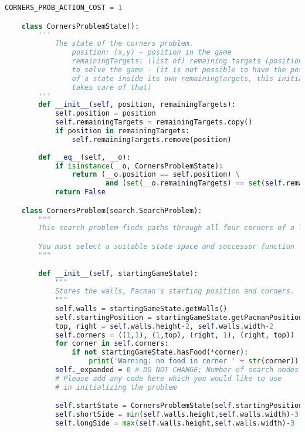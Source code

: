 \documentclass{article}
\begin{document}
\begin{lstlisting}[language=python,captionpos=t,caption={The state and problem definition of the corners problem (\emph{searchAgents.py})}]
    CORNERS_PROB_ACTION_COST = 1

    class CornersProblemState():
        '''
            The state of the corners problem.
                position: (x,y) - position in the game
                remainingTargets: (list of) remaining targets (positions) 
                to solve the game - (it is not possible to have the position 
                of a state inside its own remainingTargets, this initialization
                takes care of that)
        '''
        def __init__(self, position, remainingTargets):
            self.position = position
            self.remainingTargets = remainingTargets.copy()
            if position in remainingTargets:
                self.remainingTargets.remove(position)
        
        def __eq__(self, __o):
            if isinstance(__o, CornersProblemState):
                return (__o.position == self.position) \
                        and (set(__o.remainingTargets) == set(self.remainingTargets)) 
            return False

    class CornersProblem(search.SearchProblem):
        """
        This search problem finds paths through all four corners of a layout.

        You must select a suitable state space and successor function
        """

        def __init__(self, startingGameState):
            """
            Stores the walls, Pacman's starting position and corners.
            """
            self.walls = startingGameState.getWalls()
            self.startingPosition = startingGameState.getPacmanPosition()
            top, right = self.walls.height-2, self.walls.width-2
            self.corners = ((1,1), (1,top), (right, 1), (right, top))
            for corner in self.corners:
                if not startingGameState.hasFood(*corner):
                    print('Warning: no food in corner ' + str(corner))
            self._expanded = 0 # DO NOT CHANGE; Number of search nodes expanded
            # Please add any code here which you would like to use
            # in initializing the problem

            self.startState = CornersProblemState(self.startingPosition, list(self.corners))
            self.shortSide = min(self.walls.height,self.walls.width)-3
            self.longSide = max(self.walls.height,self.walls.width)-3


\end{lstlisting}
\end{document}
